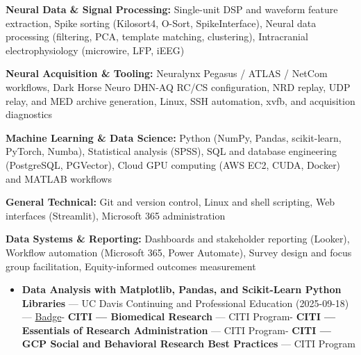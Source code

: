 \documentclass[11pt]{article}
\providecommand{\tightlist}{\setlength{\itemsep}{0pt}\setlength{\parskip}{0pt}}
\renewcommand{\subsection}[1]{\par\medskip\noindent{\sffamily\bfseries\fontsize{11pt}{0}\selectfont #1}\par\smallskip}
\begin{document}
\textbf{Neural Data \& Signal Processing:} Single-unit DSP and waveform
feature extraction, Spike sorting (Kilosort4, O-Sort, SpikeInterface),
Neural data processing (filtering, PCA, template matching, clustering),
Intracranial electrophysiology (microwire, LFP, iEEG)

\textbf{Neural Acquisition \& Tooling:} Neuralynx Pegasus / ATLAS /
NetCom workflows, Dark Horse Neuro DHN-AQ RC/CS configuration, NRD
replay, UDP relay, and MED archive generation, Linux, SSH automation,
xvfb, and acquisition diagnostics

\textbf{Machine Learning \& Data Science:} Python (NumPy, Pandas,
scikit-learn, PyTorch, Numba), Statistical analysis (SPSS), SQL and
database engineering (PostgreSQL, PGVector), Cloud GPU computing (AWS
EC2, CUDA, Docker) and MATLAB workflows

\textbf{General Technical:} Git and version control, Linux and shell
scripting, Web interfaces (Streamlit), Microsoft 365 administration

\textbf{Data Systems \& Reporting:} Dashboards and stakeholder reporting
(Looker), Workflow automation (Microsoft 365, Power Automate), Survey
design and focus group facilitation, Equity-informed outcomes
measurement

\subsection{Certifications}\label{certifications}

\begin{itemize}
\tightlist
\item
  \textbf{Data Analysis with Matplotlib, Pandas, and Scikit-Learn Python
  Libraries} --- UC Davis Continuing and Professional Education
  (2025-09-18) ---
  \href{https://www.credly.com/badges/505ef11c-58b4-48bd-aa9e-5a21f0247d46/public_url}{Badge}-
  \textbf{CITI --- Biomedical Research} --- CITI Program- \textbf{CITI
  --- Essentials of Research Administration} --- CITI Program-
  \textbf{CITI --- GCP Social and Behavioral Research Best Practices}
  --- CITI Program
\end{itemize}
\end{document}
